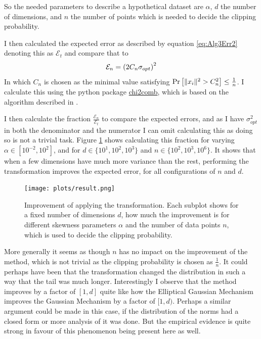 \documentclass[a4paper,12pt]{article}
\begin{document}
So the needed parameters to describe a hypothetical dataset are $\alpha$, $d$ the number of dimensions, and 
$n$ the number of points which is needed to decide the clipping probability.

I then calculated the expected error as described by equation 
\eqref{eq:Alg3Err2} denoting this as $\mathcal{E}_t$ and compare that to
\[
    \mathcal{E}_n = \left (2C_n\sigma_{opt}\right)^2
\]
In which $C_n$ is chosen as the minimal value satisfying 
$\Pr\left [ \|x_i\|^2 > C_n^2 \right] \le \frac{1}{n}$.
I calculate this using the python package \href{https://pypi.org/project/chi2comb/}{chi2comb}, 
which is based on the algorithm described in \cite{daviesalgo}.

I then calculate the fraction $\frac{\mathcal{E}_n}{\mathcal{E}_t}$ to compare 
the expected errors, and as I have $\sigma_{opt}^2$ in both the denominator and the numerator I 
can omit calculating this as doing so is not a trivial task. 
Figure \ref{fig:result} shows calculating this fraction for varying $\alpha \in [10^{-2}, 10^2]$, and for 
$d \in \{10^1, 10^2, 10^3\}$ and $n \in \{10^2, 10^3, 10^6\}$.
It shows that when a few dimensions have much more variance than the rest,
performing the transformation improves the expected error, for all 
configurations of $n$ and $d$.
\begin{figure}[h!]
\label{fig:result}
\texttt{[image: plots/result.png]}
\caption{Improvement of applying the transformation. 
Each subplot shows for a fixed number of dimensions $d$, how much the improvement is for different 
skewness parameters $\alpha$ and the number of data points $n$,
 which is used to decide the clipping probability.}
\end{figure}



More generally it seems as though $n$ has no impact on the improvement of the method, 
which is not trivial as the clipping probability is chosen as $\frac{1}{n}$. 
It could perhaps have been that the transformation changed the distribution in such a way
that the tail was much longer.
Interestingly I observe that the method improves by a factor of $[1,d]$ 
quite like how the Elliptical Gaussian Mechanism improves the Gaussian Mechanism by a 
factor of $[1,d)$. Perhaps a similar argument could be made in this case, 
if the distribution of the norms had a closed form or more analysis of it was done.
But the empirical evidence is quite strong in favour of this phenomenon being present here as well. \\
\end{document}
